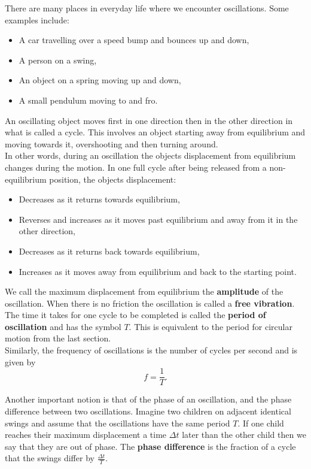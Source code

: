 \documentclass[a4paper,12pt]{book}
\begin{document}
There are many places in everyday life where we encounter oscillations. Some examples include:
\begin{itemize}
\setlength{\itemsep}{-5pt}
    \item A car travelling over a speed bump and bounces up and down,
    \item A person on a swing,
    \item An object on a spring moving up and down,
    \item A small pendulum moving to and fro.
\end{itemize} 

An oscillating object moves first in one direction then in the other direction in what is called a cycle. This involves an object starting away from equilibrium and moving towards it, overshooting and then turning around.\\

In other words, during an oscillation the objects displacement from equilibrium changes during the motion. In one full cycle after being released from a non-equilibrium position, the objects displacement:
\begin{itemize}
\setlength{\itemsep}{-5pt}
    \item Decreases as it returns towards equilibrium,
    \item Reverses and increases as it moves past equilibrium and away from it in the other direction,
    \item Decreases as it returns back towards equilibrium,
    \item Increases as it moves away from equilibrium and back to the starting point.
\end{itemize} 

We call the maximum displacement from equilibrium the \textbf{amplitude} of the oscillation. When there is no friction the oscillation is called a \textbf{free vibration}. The time it takes for one cycle to be completed is called the \textbf{period of oscillation} and has the symbol $T$. This is equivalent to the period for circular motion from the last section. \\

Similarly, the frequency of oscillations is the number of cycles per second and is given by
\begin{equation*}
f=\frac{1}{T}.
\end{equation*}

Another important notion is that of the phase of an oscillation, and the phase difference between two oscillations. Imagine two children on adjacent identical swings and assume that the oscillations have the same period $T$. If one child reaches their maximum displacement a time $\Delta t$ later than the other child then we say that they are out of phase. The \textbf{phase difference} is the fraction of a cycle that the swings differ by $\frac{\Delta t}{T}$.\\
\end{document}
